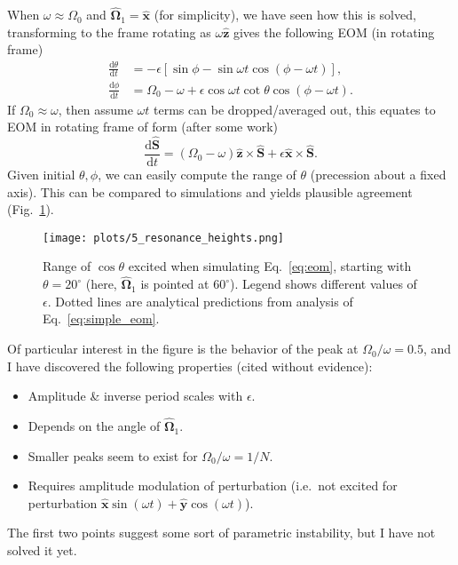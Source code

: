 \documentclass[10pt,
        usenames, %
        dvipsnames, %
    ]{article}
\newcommand*{\rd}[2]{\frac{\mathrm{d}#1}{\mathrm{d}#2}}
\newcommand*{\bm}[1]{\boldsymbol{\mathbf{#1}}}
\newcommand*{\uv}[1]{\hat{\bm{#1}}}
\newcommand*{\p}[1]{\left(#1\right)}
\newcommand*{\s}[1]{\left[#1\right]}
\begin{document}
When $\omega \approx \Omega_0$ and $\uv{\Omega}_1 = \uv{x}$ (for simplicity), we
have seen how this is solved, transforming to the frame rotating as $\omega
\uv{z}$ gives the following EOM (in rotating frame)
\begin{subequations}
    \begin{align}
        \rd{\theta}{t} &= -\epsilon \s{
            \sin \phi - \sin \omega t \cos\p{\phi - \omega t}},\\
        \rd{\phi}{t} &= \Omega_0 - \omega + \epsilon \cos \omega t \cot \theta
            \cos\p{\phi - \omega t}.
    \end{align}
\end{subequations}
If $\Omega_0 \approx \omega$, then assume $\omega t$ terms can be
dropped/averaged out, this equates to EOM in rotating frame of form (after some work)
\begin{equation}
    \rd{\uv{S}}{t} = \p{\Omega_0 - \omega}\uv{z} \times \uv{S}
        + \epsilon \uv{x} \times \uv{S}.\label{eq:simple_eom}
\end{equation}
Given initial $\theta, \phi$, we can easily compute the range of $\theta$
(precession about a fixed axis). This can be compared to simulations and yields
plausible agreement (Fig.~\ref{fig:5_resonance_heights}).
\begin{figure}
    \centering
    \texttt{[image: plots/5\_resonance\_heights.png]}
    \caption{Range of $\cos \theta$ excited when simulating Eq.~\eqref{eq:eom},
    starting with $\theta = 20^\circ$ (here, $\uv{\Omega}_1$ is pointed at
    $60^\circ$). Legend shows different values of $\epsilon$. Dotted lines are
    analytical predictions from analysis of
    Eq.~\eqref{eq:simple_eom}.}\label{fig:5_resonance_heights}
\end{figure}

Of particular interest in the figure is the behavior of the peak at $\Omega_0 /
\omega = 0.5$, and I have discovered the following properties (cited without
evidence):
\begin{itemize}
    \item Amplitude \& inverse period scales with $\epsilon$.
    \item Depends on the angle of $\uv{\Omega}_1$.
    \item Smaller peaks seem to exist for $\Omega_0 / \omega = 1/N$.
    \item Requires amplitude modulation of perturbation (i.e.\ not excited for
        perturbation $\uv{x}\sin(\omega t) + \uv{y}\cos\p{\omega t}$).
\end{itemize}
The first two points suggest some sort of parametric instability, but I have not
solved it yet.
\end{document}
